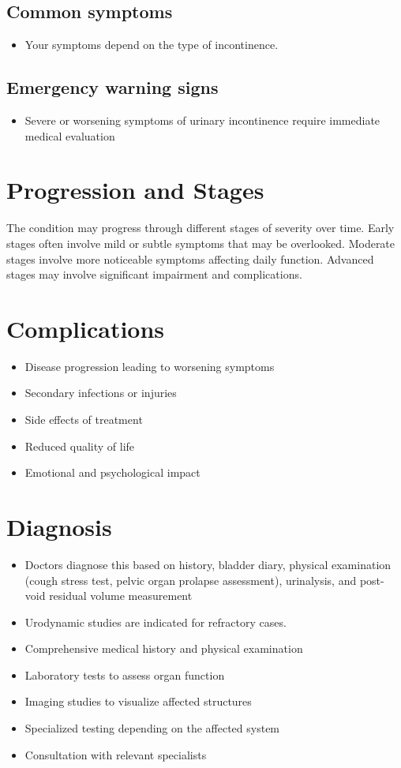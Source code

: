 \subsection{Common symptoms}
\begin{itemize}[noitemsep]
  \item Your symptoms depend on the type of incontinence. 
  \end{itemize}
\subsection{Emergency warning signs}
\begin{itemize}[noitemsep]
  \item Severe or worsening symptoms of urinary incontinence require immediate medical evaluation
\end{itemize}
\section{Progression and Stages}
The condition may progress through different stages of severity over time. Early stages often involve mild or subtle symptoms that may be overlooked. Moderate stages involve more noticeable symptoms affecting daily function. Advanced stages may involve significant impairment and complications.
\section{Complications}
\begin{itemize}[noitemsep]
  \item Disease progression leading to worsening symptoms
  \item Secondary infections or injuries
  \item Side effects of treatment
  \item Reduced quality of life
  \item Emotional and psychological impact
\end{itemize}
\section{Diagnosis}
\begin{itemize}[noitemsep]
  \item Doctors diagnose this based on history, bladder diary, physical examination (cough stress test, pelvic organ prolapse assessment), urinalysis, and post-void residual volume measurement
  \item Urodynamic studies are indicated for refractory cases.
  \item Comprehensive medical history and physical examination
  \item Laboratory tests to assess organ function
  \item Imaging studies to visualize affected structures
  \item Specialized testing depending on the affected system
  \item Consultation with relevant specialists
\end{itemize}
